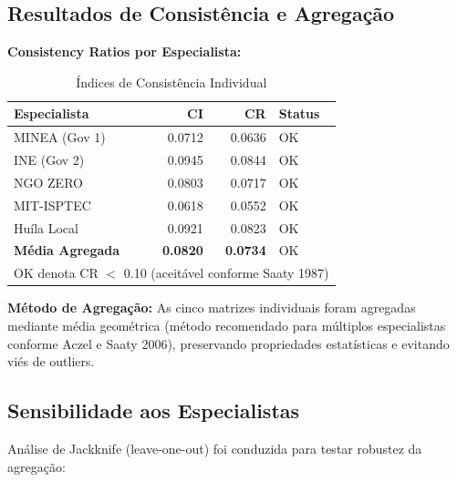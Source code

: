 \documentclass[12pt, a4paper]{article}
\begin{document}
\subsection{Resultados de Consistência e Agregação}

\textbf{Consistency Ratios por Especialista:}

\begin{table}[H]
\centering
\small
\caption{Índices de Consistência Individual}
\label{tab:cr_individual}
\begin{tabular}{lrrl}
\toprule
\rowcolor{LightBlue}\textbf{Especialista} & \textbf{CI} & \textbf{CR} & \textbf{Status} \\
\midrule
MINEA (Gov 1) & 0.0712 & 0.0636 & OK \\
INE (Gov 2) & 0.0945 & 0.0844 & OK \\
NGO ZERO & 0.0803 & 0.0717 & OK \\
MIT-ISPTEC & 0.0618 & 0.0552 & OK \\
Huíla Local & 0.0921 & 0.0823 & OK \\
\midrule
\textbf{Média Agregada} & \textbf{0.0820} & \textbf{0.0734} & OK \\
\midrule
\multicolumn{4}{l}{OK denota CR $<$ 0.10 (aceitável conforme Saaty 1987)} \\
\bottomrule
\end{tabular}
\end{table}

\textbf{Método de Agregação:} As cinco matrizes individuais foram agregadas mediante média geométrica (método recomendado para múltiplos especialistas conforme Aczel e Saaty 2006), preservando propriedades estatísticas e evitando viés de outliers.

\subsection{Sensibilidade aos Especialistas}

Análise de Jackknife (leave-one-out) foi conduzida para testar robustez da agregação:
\end{document}
